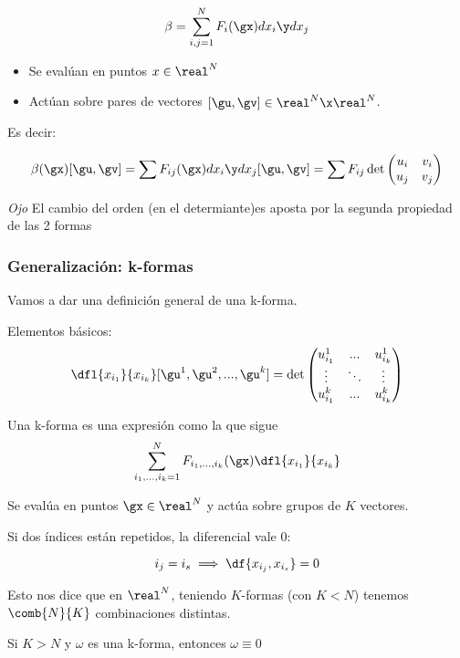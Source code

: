 \begin{defn}[2-forma]
\[\beta = \sum_{i,j=1}^N F_i(\gx) dx_i\y dx_j\]
\begin{itemize}
\item Se evalúan en puntos $x\in\real^N$
\item Actúan sobre pares de vectores $[\gu,\gv]\in\real^N\x\real^N$.
\end{itemize}

Es decir:

\[\beta(\gx)[\gu,\gv] = \sum F_{ij}(\gx) dx_i\y dx_j[\gu,\gv] = \sum F_{ij} \det \begin{pmatrix}
u_i&v_i\\u_j&v_j
\end{pmatrix}\]

\emph{Ojo} El cambio del orden (en el determiante)es aposta por la segunda propiedad de las 2 formas
\end{defn}


\subsubsection{Generalización: k-formas}
Vamos a dar una definición general de una k-forma.

Elementos básicos:
\[\dfl{x_{i_1}}{x_{i_k}}[\gu^1,\gu^2,...,\gu^k] = \det\begin{pmatrix}
u_{i_1}^1 & ... & u_{i_k}^1\\
\vdots & \ddots & \vdots\\
u_{i_1}^k & ... & u_{i_k}^k
\end{pmatrix}\]

\begin{defn}[K-forma] Una k-forma es una expresión como la que sigue
\[
\sum_{i_1,...,i_k=1}^N F_{i_1,...,i_k}(\gx)\dfl{x_{i_1}}{x_{i_k}}
\]

Se evalúa en puntos $\gx\in\real^N$ y actúa sobre grupos de $K$ vectores.
\end{defn}

\begin{lemma} Si dos índices están repetidos, la diferencial vale 0:

\[ i_j = i_s \implies \df{x_{i_j},x_{i_s}} = 0 \]

\end{lemma}

Esto nos dice que en $\real^N$, teniendo $K$-formas (con $K<N$) tenemos $\comb{N}{K}$ combinaciones distintas.

\obs Si $K>N$ y $\omega$ es una k-forma, entonces $\omega \equiv 0$


